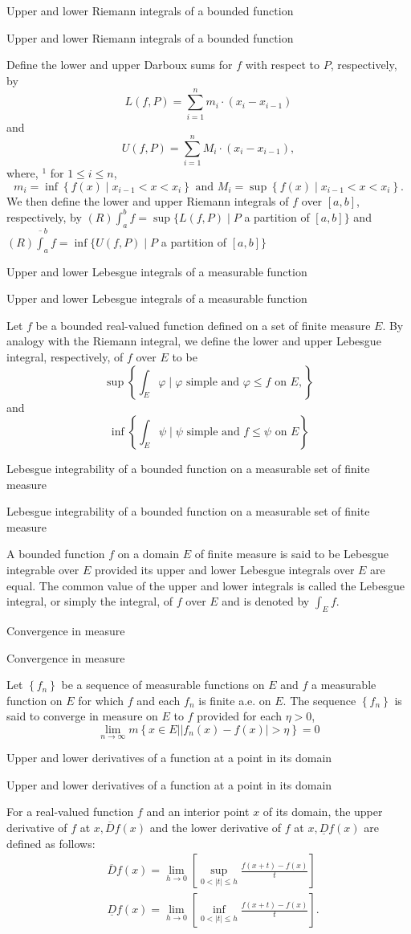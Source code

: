 \documentclass[17pt]{extarticle}
\renewcommand{\bar}[1]{\overline{#1}}
\newcommand{\boxset}[2]{\begin{mdframed}[style=darkQuesion]
#1
\end{mdframed}
\newpage
\begin{mdframed}[style=darkQuesion]
#1
  \end{mdframed}
\begin{mdframed}[style=darkAnswer]
#2
  \end{mdframed}
  \newpage
}
\begin{document}
\boxset{Upper and lower Riemann integrals of a bounded function}
{
Define the lower and upper Darboux sums for $f$ with respect to $P$, respectively, by
$$
L(f, P)=\sum_{i=1}^{n} m_{i} \cdot\left(x_{i}-x_{i-1}\right)
$$
and
$$
U(f, P)=\sum_{i=1}^{n} M_{i} \cdot\left(x_{i}-x_{i-1}\right),
$$
where, ${ }^{1}$ for $1 \leq i \leq n$,
$$
m_{i}=\inf \left\{f(x) \mid x_{i-1}<x<x_{i}\right\} \text { and } M_{i}=\sup \left\{f(x) \mid x_{i-1}<x<x_{i}\right\} .
$$
We then define the lower and upper Riemann integrals of $f$ over $[a, b]$, respectively, by
$(R) \int_{a}^{b} f=\sup \{L(f, P) \mid P$ a partition of $[a, b]\}$
and
$(R) \bar{\int}_{a}^{b} f=\inf \{U(f, P) \mid P$ a partition of $[a, b]\}$
}
\boxset{Upper and lower Lebesgue integrals of a measurable function}
{
Let $f$ be a bounded real-valued function defined on a set of finite measure $E$. By analogy with the Riemann integral, we define the lower and upper Lebesgue integral, respectively, of $f$ over $E$ to be
$$
\sup \left\{\int_{E} \varphi \mid \varphi \text { simple and } \varphi \leq f \text { on } E,\right\}
$$
and
$$
\inf \left\{\int_{E} \psi \mid \psi \text { simple and } f \leq \psi \text { on } E\right\}
$$
}
\boxset{Lebesgue integrability of a bounded function on a measurable set of finite measure}
{
A bounded function $f$ on a domain $E$ of finite measure is said to be Lebesgue integrable over $E$ provided its upper and lower Lebesgue integrals over $E$ are equal. The common value of the upper and lower integrals is called the Lebesgue integral, or simply the integral, of $f$ over $E$ and is denoted by $\int_{E} f$.
}
\boxset{Convergence in measure}
{
Let $\left\{f_{n}\right\}$ be a sequence of measurable functions on $E$ and $f$ a measurable function on $E$ for which $f$ and each $f_{n}$ is finite a.e. on $E$. The sequence $\left\{f_{n}\right\}$ is said to converge in measure on $E$ to $f$ provided for each $\eta>0$,
$$
\lim _{n \rightarrow \infty} m\left\{x \in E|| f_{n}(x)-f(x) \mid>\eta\right\}=0
$$
}
\boxset{Upper and lower derivatives of a function at a point in its domain}
{
For a real-valued function $f$ and an interior point $x$ of its domain, the upper derivative of $f$ at $x, \bar{D} f(x)$ and the lower derivative of $f$ at $x, \underline{D} f(x)$ are defined as follows:
$$
\begin{aligned}
&\bar{D} f(x)=\lim _{h \rightarrow 0}\left[\sup _{0<|t| \leq h} \frac{f(x+t)-f(x)}{t}\right] \\
&\underline{D} f(x)=\lim _{h \rightarrow 0}\left[\inf _{0<|t| \leq h} \frac{f(x+t)-f(x)}{t}\right] .
\end{aligned}
$$
}
\end{document}
